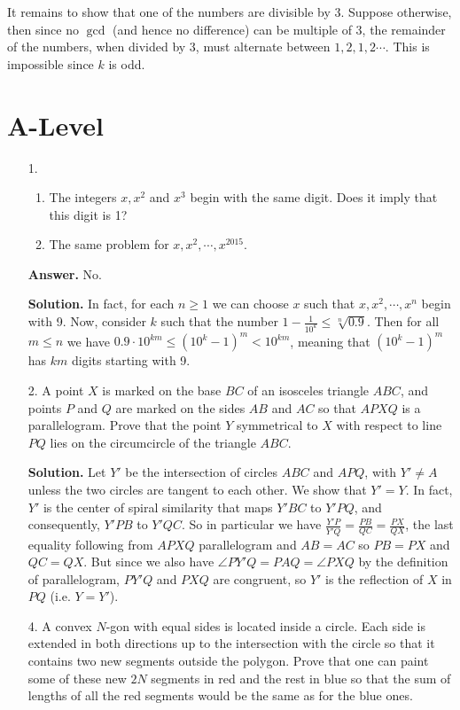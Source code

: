 \documentclass[11pt,a4paper]{article}
\begin{document}
\begin{enumerate}
	It remains to show that one of the numbers are divisible by 3. 
	Suppose otherwise, then since no $\gcd$ (and hence no difference) can be multiple of 3, 
	the remainder of the numbers, when divided by 3, must alternate between $1, 2, 1, 2\cdots$. 
	This is impossible since $k$ is odd. 
\end{enumerate}

\section*{A-Level}
\begin{enumerate}
	\item[1.]
	\begin{enumerate}
		\item The integers $x, x^2$ and $x^3$ begin with the same digit. 
		Does it imply that this digit is 1?
		\item The same problem for $x, x^2, \cdots, x^{2015}$. 
	\end{enumerate}
	
	\textbf{Answer.} No. 
	
	\textbf{Solution.} In fact, for each $n\ge 1$ we can choose $x$ such that $x, x^2, \cdots, x^{n}$ begin with 9. 
	Now, consider $k$ such that the number $1-\frac{1}{10^k}\le \sqrt[n]{0.9}$. 
	Then for all $m\le n$ we have $0.9\cdot 10^{km}\le (10^k-1)^m < 10^{km}$, 
	meaning that $(10^k-1)^m$ has $km$ digits starting with 9. 
	
	\item[2.]
	A point $X$ is marked on the base $BC$ of an isosceles triangle $ABC$, and points $P$ and $Q$ are
	marked on the sides $AB$ and $AC$ so that $AP XQ$ is a parallelogram. Prove that the point $Y$
	symmetrical to $X$ with respect to line $PQ$ lies on the circumcircle of the triangle $ABC$.
	
	\textbf{Solution.} 
	Let $Y'$ be the intersection of circles $ABC$ and $APQ$, 
	with $Y'\neq A$ unless the two circles are tangent to each other. 
	We show that $Y'=Y$. 
	In fact, $Y'$ is the center of spiral similarity that maps $Y'BC$ to $Y'PQ$, and consequently, $Y'PB$ to $Y'QC$. 
	So in particular we have $\frac{Y'P}{Y'Q}=\frac{PB}{QC}=\frac{PX}{QX}$, 
	the last equality following from $APXQ$ parallelogram and $AB=AC$ so $PB=PX$ and $QC=QX$. 
	But since we also have $\angle PY'Q=PAQ=\angle PXQ$ by the definition of parallelogram, 
	$PY'Q$ and $PXQ$ are congruent, so $Y'$ is the reflection of $X$ in $PQ$ (i.e. $Y=Y'$). 
	
	\item[4.]
	A convex $N$-gon with equal sides is located inside a circle. Each side is extended in both directions
	up to the intersection with the circle so that it contains two new segments outside the polygon.
	Prove that one can paint some of these new $2N$ segments in red and the rest in blue so that the
	sum of lengths of all the red segments would be the same as for the blue ones.
	

\end{enumerate}
\end{document}
